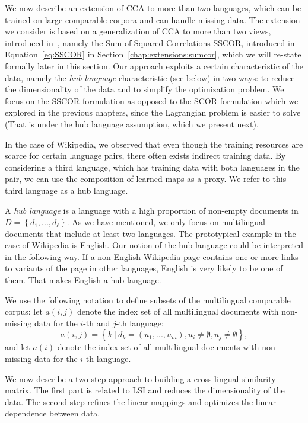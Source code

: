 We now describe an extension of CCA to more than two languages, which can be trained on
large comparable corpora and can handle missing data. The extension we consider is based on
a generalization of CCA to more than two views, introduced in~\cite{Kettenring}, namely
the Sum of Squared Correlations SSCOR, introduced in Equation~\ref{eq:SSCOR} in
Section~\ref{chap:extensions:sumcor}, which we will re-state formally later in this section.
Our approach exploits a certain characteristic of the data, namely the \emph{hub language}
characteristic (see below) in two ways: to reduce the dimensionality of the data and to
simplify the optimization problem. We focus on the SSCOR formulation as opposed to the SCOR
formulation which we explored in the previous chapters, since the Lagrangian problem is easier
to solve (That is under the hub language assumption, which we present next).

In the case of Wikipedia, we observed that even though the training resources are scarce
for certain language pairs, there often exists indirect training data. By considering
a third language, which has training data with both languages in the pair,  we can use
the composition of learned maps as a proxy. We refer to this third language as a hub language.

A \emph{hub language} is a language with a high proportion of non-empty documents in
$D = \left\{d_1,..., d_{\ell}\right\}$. As we have mentioned, we only focus on multilingual
documents that include at least two languages. The prototypical example in the case of
Wikipedia is English. Our notion of the hub language could be interpreted in the following
way. If a non-English Wikipedia page contains one or more links to variants of the page in
other languages, English is very likely to be one of them. That makes English a hub language.

We use the following notation to define subsets of the multilingual comparable corpus:
let $a(i,j)$ denote the index set of all multilingual documents with non-missing data
for the $i$-th and $j$-th language:
$$a(i,j) = \left\{k~ |~ d_k = (u_1,...,u_m), u_i \neq \emptyset, u_j \neq \emptyset \right\},$$
and let $a(i)$ denote the index set of all multilingual documents with non missing data
for the $i$-th language.

We now describe a two step approach to building a cross-lingual similarity matrix.
The first part is related to LSI and reduces the dimensionality of the data. The second
step refines the linear mappings and optimizes the linear dependence between data.

